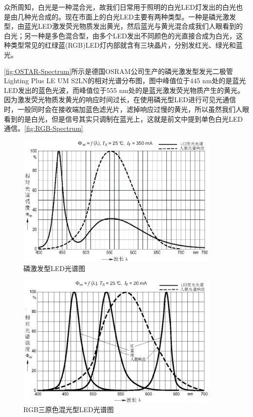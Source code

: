 众所周知，白光是一种混合光，故我们日常用于照明的白光LED灯发出的白光也是由几种光合成的。现在市面上的白光LED主要有两种类型。一种是磷光激发型，由蓝光LED激发荧光物质发出黄光，然后蓝光与黄光混合成我们人眼看到的白光；另一种是多色混合型，由多个LED发出不同颜色的光直接合成为白光，这种类型常见的红绿蓝(RGB)LED灯内部就含有三块晶片，分别发红光、绿光和蓝光。

\autoref{fig:OSTAR-Spectrum}所示是德国OSRAM公司生产的磷光激发型发光二极管Lighting Plus LE UM S2LN的相对光谱分布图\cite{LE2011}，图中峰值位于445 nm处的是蓝光LED发出的蓝色光波，而峰值位于555 nm处的是蓝光激发荧光物质产生的黄光。因为激发荧光物质发黄光的响应时间过长，在使用磷光型LED进行可见光通信时，一般同时会在接收端加蓝色滤光片，滤掉响应过慢的黄光，所以虽然我们人眼看到的是白光，但是信号其实只调制在蓝光上，这就是前文中提到单色白光LED通信。\autoref{fig:RGB-Spectrum}

\begin{figure}[htbp]
\centering
\includegraphics[width=0.9\textwidth]{figures/chapter-2/LEUWS2LN-RelativeSpectralEmission.eps}
\caption{磷激发型LED光谱图}
\label{fig:OSTAR-Spectrum}
\end{figure}

\begin{figure}[htbp]
\centering
\includegraphics[width=0.9\textwidth]{figures/chapter-2/LRTBR98G-RGB-RelativeSpectralEmission.eps}
\caption{RGB三原色混光型LED光谱图}
\label{fig:RGB-Spectrum}
\end{figure}



